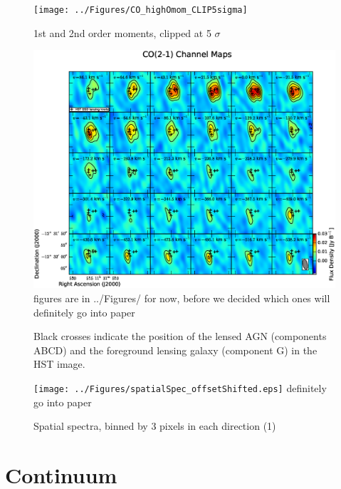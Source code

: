 \documentclass[]{emulateapj}
\begin{document}
\begin{figure}[tbph]
\centering
\texttt{[image: ../Figures/CO\_highOmom\_CLIP5sigma]}       
\caption{
1st and 2nd order moments, clipped at 5 $\sigma$
 \label{fig:}}
\end{figure}




\begin{figure}[tbph]
\centering
\includegraphics[width=\textwidth]{../Figures/co_channel_maps.eps}	 %
figures are in ../Figures/ for now, before we decided which ones will
definitely go into 
paper
\caption{
Black crosses indicate the position of the lensed AGN (components ABCD) and the
foreground lensing galaxy (component G) in the HST image.
 \label{fig:chanmap}}
\end{figure}

\begin{figure}[tbph]
\centering
\texttt{[image: ../Figures/spatialSpec\_offsetShifted.eps]}   
definitely go 
into paper
\caption{ 
Spatial spectra, binned by 3 pixels in each direction (1)
 \label{fig:spatialSpec}}
\end{figure}



\section{Continuum}
\end{document}
